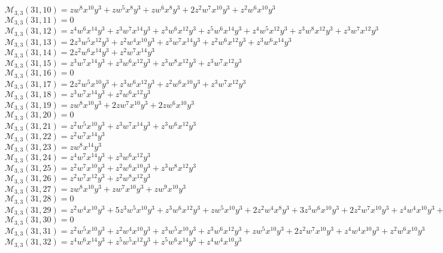 $\mathcal{M}_{3,3}(31,10)=zw^8x^{10}y^3+zw^5x^8y^3+zw^6x^8y^3+2z^2w^7x^{10}y^3+z^2w^6x^{10}y^3$\\
$\mathcal{M}_{3,3}(31,11)=0$\\
$\mathcal{M}_{3,3}(31,12)=z^4w^6x^{14}y^3+z^3w^7x^{14}y^3+z^3w^6x^{12}y^3+z^5w^6x^{14}y^3+z^4w^5x^{12}y^3+z^3w^8x^{12}y^3+z^3w^7x^{12}y^3$\\
$\mathcal{M}_{3,3}(31,13)=2z^3w^5x^{12}y^3+z^2w^4x^{10}y^3+z^3w^7x^{14}y^3+z^2w^6x^{12}y^3+z^3w^6x^{14}y^3$\\
$\mathcal{M}_{3,3}(31,14)=2z^2w^6x^{14}y^3+z^2w^7x^{14}y^3$\\
$\mathcal{M}_{3,3}(31,15)=z^3w^7x^{14}y^3+z^3w^6x^{12}y^3+z^3w^8x^{12}y^3+z^3w^7x^{12}y^3$\\
$\mathcal{M}_{3,3}(31,16)=0$\\
$\mathcal{M}_{3,3}(31,17)=2z^2w^5x^{10}y^3+z^3w^6x^{12}y^3+z^2w^6x^{10}y^3+z^3w^7x^{12}y^3$\\
$\mathcal{M}_{3,3}(31,18)=z^3w^7x^{14}y^3+z^2w^6x^{12}y^3$\\
$\mathcal{M}_{3,3}(31,19)=zw^8x^{10}y^3+2zw^7x^{10}y^3+2zw^6x^{10}y^3$\\
$\mathcal{M}_{3,3}(31,20)=0$\\
$\mathcal{M}_{3,3}(31,21)=z^2w^5x^{10}y^3+z^3w^7x^{14}y^3+z^3w^6x^{12}y^3$\\
$\mathcal{M}_{3,3}(31,22)=z^2w^7x^{14}y^3$\\
$\mathcal{M}_{3,3}(31,23)=zw^8x^{14}y^3$\\
$\mathcal{M}_{3,3}(31,24)=z^4w^7x^{14}y^3+z^3w^6x^{12}y^3$\\
$\mathcal{M}_{3,3}(31,25)=z^2w^7x^{10}y^3+z^2w^6x^{10}y^3+z^3w^8x^{12}y^3$\\
$\mathcal{M}_{3,3}(31,26)=z^2w^7x^{12}y^3+z^2w^8x^{12}y^3$\\
$\mathcal{M}_{3,3}(31,27)=zw^8x^{10}y^3+zw^7x^{10}y^3+zw^9x^{10}y^3$\\
$\mathcal{M}_{3,3}(31,28)=0$\\
$\mathcal{M}_{3,3}(31,29)=z^2w^4x^{10}y^3+5z^3w^5x^{10}y^3+z^3w^6x^{12}y^3+zw^5x^{10}y^3+2z^2w^4x^8y^3+3z^3w^6x^{10}y^3+2z^2w^7x^{10}y^3+z^4w^4x^{10}y^3+z^2w^5x^8y^3$\\
$\mathcal{M}_{3,3}(31,30)=0$\\
$\mathcal{M}_{3,3}(31,31)=z^2w^5x^{10}y^3+z^2w^4x^{10}y^3+z^3w^5x^{10}y^3+z^3w^6x^{12}y^3+zw^5x^{10}y^3+2z^2w^7x^{10}y^3+z^4w^4x^{10}y^3+z^2w^6x^{10}y^3$\\
$\mathcal{M}_{3,3}(31,32)=z^4w^6x^{14}y^3+z^5w^5x^{12}y^3+z^5w^6x^{14}y^3+z^4w^4x^{10}y^3$\\

